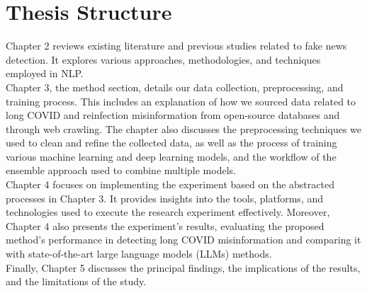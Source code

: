 \section{Thesis Structure}
Chapter 2 reviews existing literature and previous studies related to fake news detection. It explores various approaches, methodologies, and techniques employed in NLP.
\\

Chapter 3, the method section, details our data collection, preprocessing, and training process. This includes an explanation of how we sourced data related to long COVID and reinfection misinformation from open-source databases and through web crawling. The chapter also discusses the preprocessing techniques we used to clean and refine the collected data, as well as the process of training various machine learning and deep learning models, and the workflow of the ensemble approach used to combine multiple models.
\\

Chapter 4 focuses on implementing the experiment based on the abstracted processes in Chapter 3. It provides insights into the tools, platforms, and technologies used to execute the research experiment effectively. Moreover, Chapter 4 also presents the experiment’s results, evaluating the proposed method’s performance in detecting long COVID misinformation and comparing it with state-of-the-art large language models (LLMs) methods.
\\

Finally, Chapter 5 discusses the principal findings, the implications of the results, and the limitations of the study.

